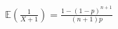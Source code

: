 \documentclass[preview]{standalone}
\begin{document}
\begin{align*}
\mathbb{E}\left(\frac{1}{X+1}\right) = \frac{1 - (1-p)^{n+1}}{(n+1)p}
\end{align*}
\end{document}
